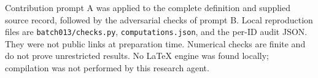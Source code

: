 \documentclass[11pt]{article}
\begin{document}
Contribution prompt A was applied to the complete definition and supplied source record, followed by the adversarial checks of prompt B. Local reproduction files are \texttt{batch013/checks.py}, \texttt{computations.json}, and the per-ID audit JSON. They were not public links at preparation time. Numerical checks are finite and do not prove unrestricted results. No LaTeX engine was found locally; compilation was not performed by this research agent.
\end{document}
